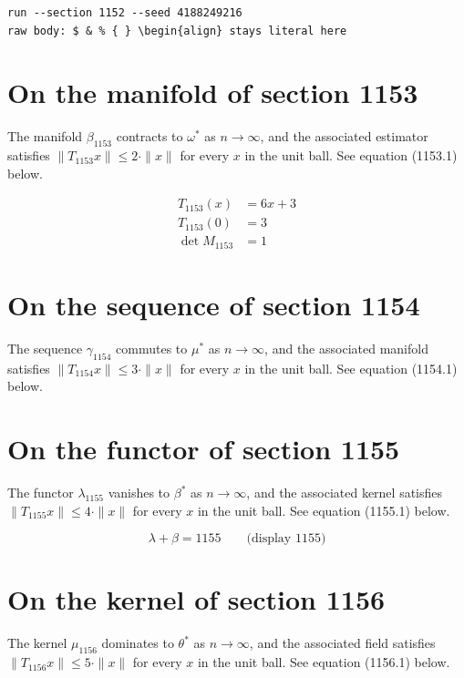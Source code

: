 \documentclass{article}
\begin{document}
\begin{verbatim}
run --section 1152 --seed 4188249216
raw body: $ & % { } \begin{align} stays literal here
\end{verbatim}

\section{On the manifold of section 1153}
The manifold $\beta_{1153}$ contracts to $\omega^{*}$ as $n \to \infty$,
and the associated estimator satisfies $\|T_{1153} x\| \leq 2 \cdot \|x\|$
for every $x$ in the unit ball. See equation (1153.1) below.

\begin{align}
T_{1153}(x) &= 6 x + 3 \\
T_{1153}(0) &= 3 \\
\det M_{1153} &= 1
\end{align}

\section{On the sequence of section 1154}
The sequence $\gamma_{1154}$ commutes to $\mu^{*}$ as $n \to \infty$,
and the associated manifold satisfies $\|T_{1154} x\| \leq 3 \cdot \|x\|$
for every $x$ in the unit ball. See equation (1154.1) below.

\section{On the functor of section 1155}
The functor $\lambda_{1155}$ vanishes to $\beta^{*}$ as $n \to \infty$,
and the associated kernel satisfies $\|T_{1155} x\| \leq 4 \cdot \|x\|$
for every $x$ in the unit ball. See equation (1155.1) below.

$$
\lambda + \beta = 1155 \qquad \text{(display 1155)}
$$

\section{On the kernel of section 1156}
The kernel $\mu_{1156}$ dominates to $\theta^{*}$ as $n \to \infty$,
and the associated field satisfies $\|T_{1156} x\| \leq 5 \cdot \|x\|$
for every $x$ in the unit ball. See equation (1156.1) below.
\end{document}
